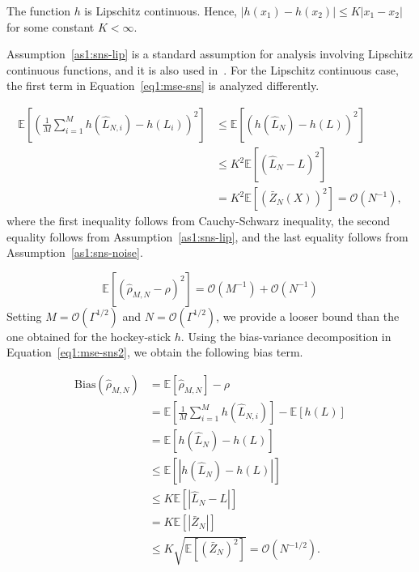 \begin{assumption}\label{as1:sns-lip}
    The function $h$ is Lipschitz continuous. Hence, $|h(x_1) - h(x_2)| \leq K|x_1 - x_2|$ for some constant $K< \infty$.
\end{assumption}
Assumption~\ref{as1:sns-lip} is a standard assumption for analysis involving Lipschitz continuous functions, and it is also used in~\cite{broadie2015risk}.
For the Lipschitz continuous case, the first term in Equation~\eqref{eq1:mse-sns} is analyzed differently.

\begin{align}
    \mathbb{E} \left[  \left( \frac{1}{M} \sum_{i=1}^M h\left( \hat{L}_{N, i} \right) -  h\left(L_i \right)  \right)^2\right]    
    & \leq \mathbb{E} \left[ \left( h\left( \hat{L}_N \right) -  h\left(L \right)  \right)^2\right]  \nonumber \\
    & \leq K^2 \mathbb{E} \left[ \left( \hat{L}_N -  L  \right)^2\right] \nonumber \\
    & = K^2 \mathbb{E} \left[ \left( \bar{Z}_{N}(X) \right)^2\right] = \mathcal{O}(N^{-1}),
\end{align}
where the first inequality follows from Cauchy-Schwarz inequality, the second equality follows from Assumption~\ref{as1:sns-lip}, and the last equality follows from Assumption~\ref{as1:sns-noise}.

\begin{equation}
    \mathbb{E} \left[ \left( \hat{\rho}_{M, N} - \rho \right)^2 \right] = \mathcal{O}(M^{-1}) + \mathcal{O}(N^{-1})
\end{equation}
Setting $M = \mathcal{O}(\Gamma^{1/2})$ and $N = \mathcal{O}(\Gamma^{1/2})$, we provide a looser bound than the one obtained for the hockey-stick $h$.
Using the bias-variance decomposition in Equation~\eqref{eq1:mse-sns2}, we obtain the following bias term.

\begin{align}\label{eq1:bias-sns-lip}
    \text{Bias}(\hat{\rho}_{M, N})
    & = \mathbb{E} \left[ \hat{\rho}_{M, N} \right] - \rho \nonumber \\
    & = \mathbb{E} \left[ \frac{1}{M} \sum_{i=1}^M h\left( \hat{L}_{N, i} \right) \right] - \mathbb{E} \left[ h\left(L \right) \right]  \nonumber \\
    & = \mathbb{E} \left[ h\left( \hat{L}_N \right) - h\left( L \right) \right] \nonumber \\
    & \leq \mathbb{E} \left[ |h\left( \hat{L}_N \right) - h\left( L \right) | \right] \nonumber \\
    & \leq K \mathbb{E} \left[ |\hat{L}_N - L| \right] \nonumber \\
    & = K \mathbb{E} \left[ |\bar{Z}_N| \right] \nonumber \\
    & \leq K \sqrt{\mathbb{E} \left[ \left( \bar{Z}_N \right)^2 \right]} = \mathcal{O}(N^{-1/2}).
\end{align}

